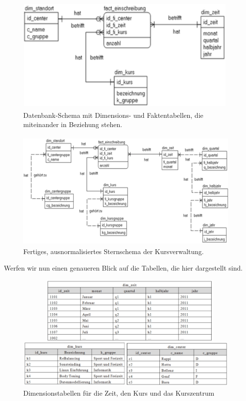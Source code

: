 \documentclass[a4paper, 11pt, nofootinbib]{article}
\begin{document}
\begin{figure}[htb]
	\centering
	\includegraphics[keepaspectratio=true,height=9\baselineskip]{db-schema_bez.jpg}
	\caption{Datenbank-Schema mit Dimensions- und Faktentabellen, die miteinander in Beziehung stehen.}
	\label{fig:db-schema_bez}
\end{figure}

\begin{figure}[htb]
	\centering
	\includegraphics[keepaspectratio=true,height=13\baselineskip]{star_schema.jpg}
	\caption{Fertiges, ausnormalisiertes Sternschema der Kursverwaltung.}
	\label{fig:star_schema}
\end{figure}

\newpage

\noindent Werfen wir nun einen genaueren Blick auf die Tabellen, die hier dargestellt sind. 

\begin{figure}[htb]
	\centering
	\includegraphics[keepaspectratio=true,height=15\baselineskip]{dim_tables.jpg}
	\caption{Dimensionstabellen für die Zeit, den Kurs und das Kurszentrum}
	\label{fig:dim_tables}
\end{figure}
\end{document}

